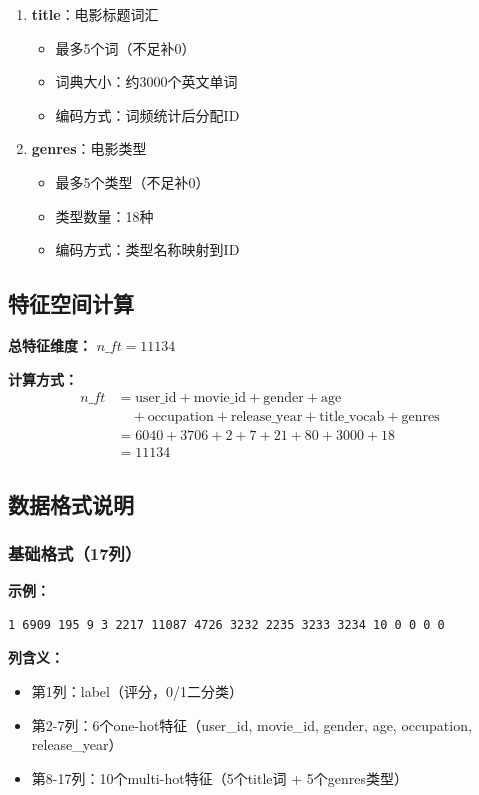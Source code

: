 \documentclass[12pt,a4paper]{article}
\begin{document}
\begin{enumerate}
    \item \textbf{title}：电影标题词汇
    \begin{itemize}
        \item 最多5个词（不足补0）
        \item 词典大小：约3000个英文单词
        \item 编码方式：词频统计后分配ID
    \end{itemize}
    
    \item \textbf{genres}：电影类型
    \begin{itemize}
        \item 最多5个类型（不足补0）
        \item 类型数量：18种
        \item 编码方式：类型名称映射到ID
    \end{itemize}
\end{enumerate}

\subsection{特征空间计算}

\textbf{总特征维度：} $n\_ft = 11134$

\textbf{计算方式：}
\begin{align*}
n\_ft &= \text{user\_id} + \text{movie\_id} + \text{gender} + \text{age} \\
      &\quad + \text{occupation} + \text{release\_year} + \text{title\_vocab} + \text{genres} \\
      &= 6040 + 3706 + 2 + 7 + 21 + 80 + 3000 + 18 \\
      &= 11134
\end{align*}

\subsection{数据格式说明}

\subsubsection{基础格式（17列）}

\textbf{示例：}
\begin{lstlisting}
1 6909 195 9 3 2217 11087 4726 3232 2235 3233 3234 10 0 0 0 0
\end{lstlisting}

\textbf{列含义：}
\begin{itemize}
    \item 第1列：label（评分，0/1二分类）
    \item 第2-7列：6个one-hot特征（user\_id, movie\_id, gender, age, occupation, release\_year）
    \item 第8-17列：10个multi-hot特征（5个title词 + 5个genres类型）
\end{itemize}
\end{document}

